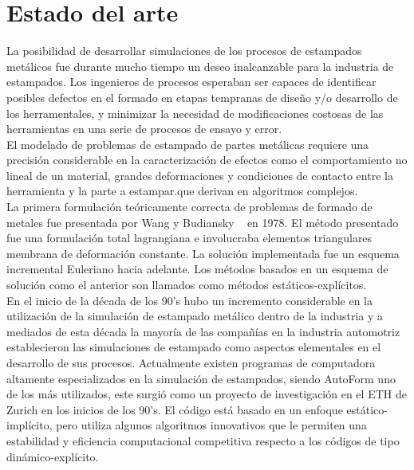 \section{Estado del arte}

La posibilidad de desarrollar simulaciones de los procesos de estampados metálicos fue durante mucho tiempo 
un deseo inalcanzable para la industria de estampados. Los ingenieros de procesos esperaban ser capaces de 
identificar posibles defectos en el formado en etapas tempranas de diseño y/o desarrollo de los herramentales, 
y minimizar la necesidad de modificaciones costosas de las herramientas en una serie de procesos de ensayo y error. \\

El modelado de problemas de estampado de partes metálicas requiere una precisión considerable en la caracterización 
de efectos como el comportamiento no lineal de un material, grandes deformaciones y condiciones de contacto entre la
herramienta y la parte a estampar.que derivan  en algoritmos complejos.\cite{banabic2000}\\

La primera formulación teóricamente correcta de problemas de formado de metales fue presentada por 
Wang y Budiansky ~\cite{wang1978} en 1978. El método presentado fue una formulación total lagrangiana 
e involucraba elementos triangulares membrana de deformación constante. La solución implementada fue 
un esquema incremental Euleriano hacia adelante. Los métodos basados en un 
esquema de solución como el anterior son llamados como métodos estáticos-explícitos.\\

En el inicio de la década de los 90's hubo un incremento considerable en la utilización de la simulación de estampado 
metálico dentro de la industria y a mediados de esta década la mayoría de las compañías en la industria automotriz 
establecieron las simulaciones de estampado como aspectos elementales en el desarrollo de sus procesos. 
Actualmente existen programas de computadora altamente especializados en la simulación de estampados, siendo AutoForm 
uno de los más utilizados, este surgió como un proyecto de investigación en el ETH de Zurich en los inicios de los 90's. 
El código está basado en un enfoque estático-implícito, pero utiliza algunos algoritmos innovativos que le permiten 
una estabilidad y eficiencia computacional competitiva respecto a los códigos de tipo dinámico-explícito. \\ ~\cite{banabic2000}


